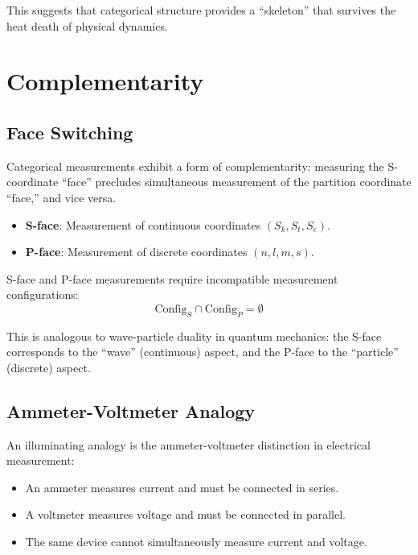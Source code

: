 This suggests that categorical structure provides a ``skeleton'' that survives the heat death of physical dynamics.

\section{Complementarity}

\subsection{Face Switching}

Categorical measurements exhibit a form of complementarity: measuring the S-coordinate ``face'' precludes simultaneous measurement of the partition coordinate ``face,'' and vice versa.

\begin{definition}
\begin{itemize}
    \item \textbf{S-face}: Measurement of continuous coordinates $(S_k, S_t, S_e)$.
    \item \textbf{P-face}: Measurement of discrete coordinates $(n, l, m, s)$.
\end{itemize}
\end{definition}

\begin{proposition}
S-face and P-face measurements require incompatible measurement configurations:
\begin{equation}
    \text{Config}_S \cap \text{Config}_P = \emptyset
\end{equation}
\end{proposition}

This is analogous to wave-particle duality in quantum mechanics: the S-face corresponds to the ``wave'' (continuous) aspect, and the P-face to the ``particle'' (discrete) aspect.

\subsection{Ammeter-Voltmeter Analogy}

An illuminating analogy is the ammeter-voltmeter distinction in electrical measurement:
\begin{itemize}
    \item An ammeter measures current and must be connected in series.
    \item A voltmeter measures voltage and must be connected in parallel.
    \item The same device cannot simultaneously measure current and voltage.
\end{itemize}

